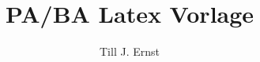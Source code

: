 %
%




\title{PA/BA Latex Vorlage}
\author{Till J. Ernst}

%

%
  
%

 

\setcounter{page}{1}
\tableofcontents
\newpage



%
%

\setcounter{page}{1}







%





